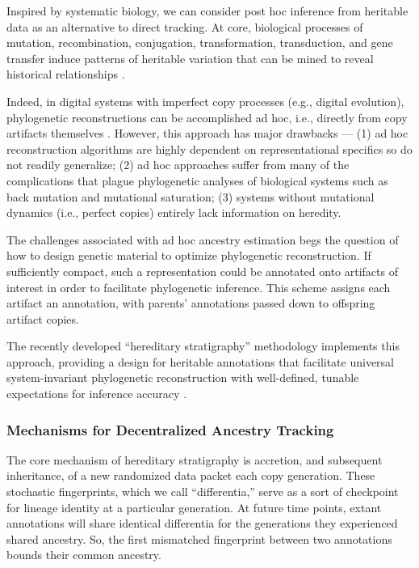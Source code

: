 Inspired by systematic biology, we can consider post hoc inference from heritable data as an alternative to direct tracking.
At core, biological processes of mutation, recombination, conjugation, transformation, transduction, and gene transfer induce patterns of heritable variation that can be mined to reveal historical relationships \citep{davis1992populations}.

Indeed, in digital systems with imperfect copy processes (e.g., digital evolution), phylogenetic reconstructions can be accomplished ad hoc, i.e., directly from copy artifacts themselves \citep{moreno2021case}.
However, this approach has major drawbacks ---
(1) ad hoc reconstruction algorithms are highly dependent on representational specifics so do not readily generalize;
(2) ad hoc approaches suffer from many of the complications that plague phylogenetic analyses of biological systems such as back mutation and mutational saturation;
(3) systems without mutational dynamics (i.e., perfect copies) entirely lack information on heredity.

The challenges associated with ad hoc ancestry estimation begs the question of how to design genetic material to optimize phylogenetic reconstruction.
If sufficiently compact, such a representation could be annotated onto artifacts of interest in order to facilitate phylogenetic inference.
This scheme assigns each artifact an annotation, with parents' annotations passed down to offspring artifact copies.

The recently developed ``hereditary stratigraphy'' methodology implements this approach, providing a design for heritable annotations that facilitate universal system-invariant phylogenetic reconstruction with well-defined, tunable expectations for inference accuracy \citep{moreno2022hereditary}.

\subsubsection{Mechanisms for Decentralized Ancestry Tracking}

The core mechanism of hereditary stratigraphy is accretion, and subsequent inheritance, of a new randomized data packet each copy generation.
These stochastic fingerprints, which we call ``differentia,'' serve as a sort of checkpoint for lineage identity at a particular generation.
At future time points, extant annotations will share identical differentia for the generations they experienced shared ancestry.
So, the first mismatched fingerprint between two annotations bounds their common ancestry.

